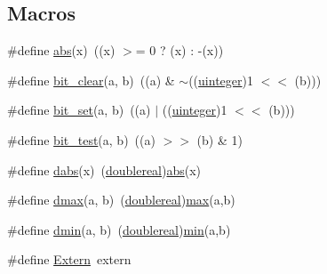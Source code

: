 \subsection*{Macros}
\begin{DoxyCompactItemize}
\item 
\#define \hyperlink{dependencies_2third-party_2clapack_23_82_81_2_i_n_c_l_u_d_e_2f2c_8h_a3aa069ac3980707dae1e0530f50d59e4}{abs}(x)~((x) $>$= 0 ? (x) \+: -\/(x))
\item 
\#define \hyperlink{dependencies_2third-party_2clapack_23_82_81_2_i_n_c_l_u_d_e_2f2c_8h_a84cfa496aaa996263f890eef454c3b42}{bit\+\_\+clear}(a,  b)~((a) \& $\sim$((\hyperlink{dependencies_2third-party_2clapack_23_82_81_2_f2_c_l_i_b_s_2libf2c_2f2c_8h_abff8ab108a8aa2095787db00a7fd5f42}{uinteger})1 $<$$<$ (b)))
\item 
\#define \hyperlink{dependencies_2third-party_2clapack_23_82_81_2_i_n_c_l_u_d_e_2f2c_8h_ad90c026e03068481dc4776e2e79c60a5}{bit\+\_\+set}(a,  b)~((a) $\vert$  ((\hyperlink{dependencies_2third-party_2clapack_23_82_81_2_f2_c_l_i_b_s_2libf2c_2f2c_8h_abff8ab108a8aa2095787db00a7fd5f42}{uinteger})1 $<$$<$ (b)))
\item 
\#define \hyperlink{dependencies_2third-party_2clapack_23_82_81_2_i_n_c_l_u_d_e_2f2c_8h_a3d670fe138b7baafb46ecdc1393e93d3}{bit\+\_\+test}(a,  b)~((a) $>$$>$ (b) \& 1)
\item 
\#define \hyperlink{dependencies_2third-party_2clapack_23_82_81_2_i_n_c_l_u_d_e_2f2c_8h_ad1f46d2294c121413c66c8777190a874}{dabs}(x)~(\hyperlink{dependencies_2third-party_2clapack_23_82_81_2_f2_c_l_i_b_s_2libf2c_2f2c_8h_a1e69afaa4e6077b67397e6c36454b97a}{doublereal})\hyperlink{include_2f2c_8h_a3aa069ac3980707dae1e0530f50d59e4}{abs}(x)
\item 
\#define \hyperlink{dependencies_2third-party_2clapack_23_82_81_2_i_n_c_l_u_d_e_2f2c_8h_ae1dcd09f9c8de5971c9a85494ab952e9}{dmax}(a,  b)~(\hyperlink{dependencies_2third-party_2clapack_23_82_81_2_f2_c_l_i_b_s_2libf2c_2f2c_8h_a1e69afaa4e6077b67397e6c36454b97a}{doublereal})\hyperlink{include_2f2c_8h_affe776513b24d84b39af8ab0930fef7f}{max}(a,b)
\item 
\#define \hyperlink{dependencies_2third-party_2clapack_23_82_81_2_i_n_c_l_u_d_e_2f2c_8h_a0978a1b8e1dc8878376a50a88725223d}{dmin}(a,  b)~(\hyperlink{dependencies_2third-party_2clapack_23_82_81_2_f2_c_l_i_b_s_2libf2c_2f2c_8h_a1e69afaa4e6077b67397e6c36454b97a}{doublereal})\hyperlink{include_2f2c_8h_ac6afabdc09a49a433ee19d8a9486056d}{min}(a,b)
\item 
\#define \hyperlink{dependencies_2third-party_2clapack_23_82_81_2_i_n_c_l_u_d_e_2f2c_8h_af9582b37076e851e1ca28b8c1a96e857}{Extern}~extern
$$
\end{DoxyCompactItemize}
